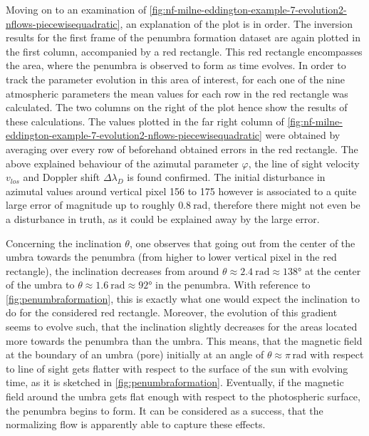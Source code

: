 \documentclass[a4paper,12pt]{report}
\begin{document}
Moving on to an examination of \cref{fig:nf-milne-eddington-example-7-evolution2-nflows-piecewisequadratic}, an explanation of the plot is in order. The inversion results for the first frame of the penumbra formation dataset are again plotted in the first column, accompanied by a red rectangle. This red rectangle encompasses the area, where the penumbra is observed to form as time evolves. In order to track the parameter evolution in this area of interest, for each one of the nine atmospheric parameters the mean values for each row in the red rectangle was calculated. The two columns on the right of the plot hence show the results of these calculations. The values plotted in the far right column of \cref{fig:nf-milne-eddington-example-7-evolution2-nflows-piecewisequadratic} were obtained by averaging over every row of beforehand obtained errors in the red rectangle. The above explained behaviour of the azimutal parameter $\varphi$, the line of sight velocity $v_{los}$ and Doppler shift $\Delta \lambda_D$ is found confirmed. The initial disturbance in azimutal values around vertical pixel 156 to 175 however is associated to a quite large error of magnitude up to roughly $\SI{0.8}{\radian}$, therefore there might not even be a disturbance in truth, as it could be explained away by the large error. 

Concerning the inclination $\theta$, one observes that going out from the center of the umbra towards the penumbra (from higher to lower vertical pixel in the red rectangle), the inclination decreases from around $\theta \approx \SI{2.4}{\radian} \approx \ang{138}$ at the center of the umbra to $\theta \approx \SI{1.6}{\radian} \approx \ang{92}$ in the penumbra. With reference to \cref{fig:penumbraformation}, this is exactly what one would expect the inclination to do for the considered red rectangle. Moreover, the evolution of this gradient seems to evolve such, that the inclination slightly decreases for the areas located more towards the penumbra than the umbra. This means, that the magnetic field at the boundary of an umbra (pore) initially at an angle of $\theta \approx \pi\,\si{\radian}$ with respect to line of sight gets flatter with respect to the surface of the sun with evolving time, as it is sketched in \cref{fig:penumbraformation}. Eventually, if the magnetic field around the umbra gets flat enough with respect to the photospheric surface, the penumbra begins to form. It can be considered as a success, that the normalizing flow is apparently able to capture these effects.
\end{document}
